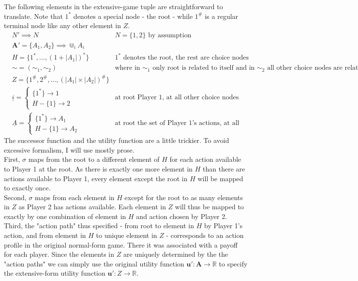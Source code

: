 \documentclass[10pt,a4paper]{article}
\begin{document}
\noindent The following elements in the extensive-game tuple are straightforward to translate. Note that $1^*$ denotes a special node - the root - while $1^{\#}$ is a regular terminal node like any other element in $Z$.
 \begin{align*}
&N' \implies N & N=\{1,2\} \text{ by assumption}\\
&\boldsymbol{A}'=\{A_1,A_2\} \implies \Cup_i A_i &\text{} \\
&H=\{1^*,...,(1+|A_1|)^*\} &\text{$1^*$ denotes the root, the rest are choice nodes for Player 2} \\
&\sim=(\sim_1,\sim_2) &\text{where in $\sim_1$ only root is related to itself and in $\sim_2$ all other choice nodes are related to each other}\\
&Z=\{1^{\#},2^{\#},...,(|A_1| \times |A_2|)^\# \}\\
&\underline{i}= \begin{cases}
\{1^*\} \rightarrow 1 \\
H-\{1\} \rightarrow 2 \end{cases} & \text{at root Player 1, at all other choice nodes Player 2}\\
&\underline{A}= \begin{cases}
\{1^*\}\rightarrow A_1  \\
H-\{1\} \rightarrow A_2 \end{cases} & \text{at root the set of Player 1's actions, at all other choice nodes Player 2's}
\end{align*}
The successor function and the utility function are a little trickier. To avoid excessive formalism, I will use mostly prose.\\
First, $\sigma$ maps from the root to a different element of $H$ for each action available to Player 1 at the root. As there is exactly one more element in $H$ than there are actions available to Player 1, every element except the root in $H$ will be mapped to exactly once.\\
Second, $\sigma$ maps from each element in $H$ except for the root to as many elements in $Z$ as Player 2 has actions available. Each element in $Z$ will thus be mapped to exactly by one combination of element in $H$ and action chosen by Player 2.\\
Third, the "action path" thus specified - from root to element in $H$ by Player 1's action, and from element in $H$ to unique element in $Z$ - corresponds to an action profile in the original normal-form game. There it was associated with a payoff for each player. Since the elements in $Z$ are uniquely determined by the the "action paths" we can simply use the original utility function $\boldsymbol{u}':\boldsymbol{A}\rightarrow \mathbb{R}$ to specify the extensive-form utility function $\boldsymbol{u}':Z\rightarrow \mathbb{R}$.\\
\end{document}
